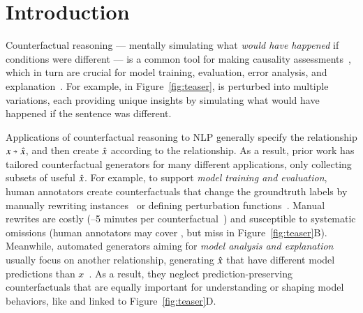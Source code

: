 \section{Introduction}
\label{sec:intro}



Counterfactual reasoning --- mentally simulating what \emph{would have happened} if conditions were different --- is a common tool for making causality assessments~\cite{kahneman}, which in turn are crucial for model training, evaluation, error analysis, and explanation~\cite{miller}. 
For example, in Figure~\ref{fig:teaser},  is perturbed into multiple variations, each providing unique insights by simulating what would have happened if the sentence was different.

Applications of counterfactual reasoning to NLP generally specify the relationship $x \veryshortarrow \xp$, and then create $\hat{x}$ according to the relationship.
As a result, prior work has tailored counterfactual generators for many different applications, only collecting subsets of useful $\hat{x}$.
For example, to support {\em model training and evaluation}, human annotators create counterfactuals that change the groundtruth labels by manually rewriting instances~\cite{gardner2020contrast} or defining perturbation functions~\cite{checklist:acl20}.
Manual rewrites are costly (--5 minutes per counterfactual~\cite{kaushik2019learning}) and susceptible to systematic omissions (\eg human annotators may cover , but miss  in Figure~\ref{fig:teaser}B).
Meanwhile, automated generators aiming for \emph{model analysis and explanation} usually focus on another relationship, \ie generating $\hat{x}$ that have different model predictions than $x$~\cite{ross2020explaining, Zhang2019GeneratingFA}. 
As a result, they neglect prediction-preserving counterfactuals that are equally important for understanding or shaping model behaviors, like  and  linked to Figure~\ref{fig:teaser}D.


